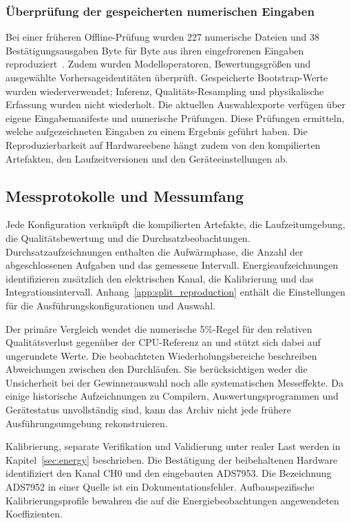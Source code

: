 \subsubsection{Überprüfung der gespeicherten numerischen Eingaben}
\label{sec:review:offline_audit}

Bei einer früheren Offline-Prüfung wurden 227 numerische Dateien und 38 Bestätigungsausgaben Byte für Byte aus ihren eingefrorenen Eingaben reproduziert~\cite{v53OfflineAudit2026}. Zudem wurden Modelloperatoren, Bewertungsgrößen und ausgewählte Vorhersageidentitäten überprüft. Gespeicherte Bootstrap-Werte wurden wiederverwendet; Inferenz, Qualitäts-Resampling und physikalische Erfassung wurden nicht wiederholt. Die aktuellen Auswahlexporte verfügen über eigene Eingabemanifeste und numerische Prüfungen. Diese Prüfungen ermitteln, welche aufgezeichneten Eingaben zu einem Ergebnis geführt haben. Die Reproduzierbarkeit auf Hardwareebene hängt zudem von den kompilierten Artefakten, den Laufzeitversionen und den Geräteeinstellungen ab.

\subsection{Messprotokolle und Messumfang}
\label{app:current_evidence_limits}

Jede Konfiguration verknüpft die kompilierten Artefakte, die Laufzeitumgebung, die Qualitätsbewertung und die Durchsatzbeobachtungen. Durchsatzaufzeichnungen enthalten die Aufwärmphase, die Anzahl der abgeschlossenen Aufgaben und das gemessene Intervall. Energieaufzeichnungen identifizieren zusätzlich den elektrischen Kanal, die Kalibrierung und das Integrationsintervall. Anhang~\ref{app:split_reproduction} enthält die Einstellungen für die Ausführungskonfigurationen und Auswahl.

Der primäre Vergleich wendet die numerische 5\%-Regel für den relativen Qualitätsverlust gegenüber der CPU-Referenz an und stützt sich dabei auf ungerundete Werte. Die beobachteten Wiederholungsbereiche beschreiben Abweichungen zwischen den Durchläufen. Sie berücksichtigen weder die Unsicherheit bei der Gewinnerauswahl noch alle systematischen Messeffekte. Da einige historische Aufzeichnungen zu Compilern, Auswertungsprogrammen und Gerätestatus unvollständig sind, kann das Archiv nicht jede frühere Ausführungsumgebung rekonstruieren.

Kalibrierung, separate Verifikation und Validierung unter realer Last werden in Kapitel~\ref{sec:energy} beschrieben. Die Bestätigung der beibehaltenen Hardware identifiziert den Kanal CH0 und den eingebauten ADS7953. Die Bezeichnung ADS7952 in einer Quelle ist ein Dokumentationsfehler. Aufbauspezifische Kalibrierungsprofile bewahren die auf die Energiebeobachtungen angewendeten Koeffizienten.

